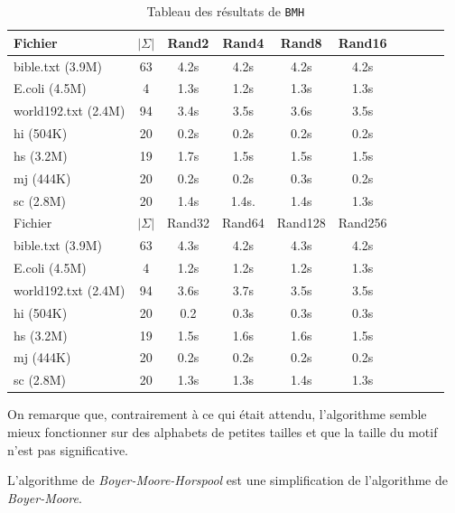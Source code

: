 \documentclass[a4paper,11pt]{article}
\begin{document}
\begin{table}[h]
  \centering
  \begin{tabular}{|l|c|c|c|c|c|c|c|c|c|}
    \hline
    Fichier             & $ | \Sigma | $ & Rand2 & Rand4 & Rand8 & Rand16 \\
    \hline
    
    bible.txt (3.9M)    & 63 & 4.2s & 4.2s  & 4.2s & 4.2s \\
    E.coli (4.5M)       & 4  & 1.3s & 1.2s  & 1.3s & 1.3s \\
    world192.txt (2.4M) & 94 & 3.4s & 3.5s  & 3.6s & 3.5s \\
    hi (504K)           & 20 & 0.2s & 0.2s  & 0.2s & 0.2s \\
    hs (3.2M)           & 19 & 1.7s & 1.5s  & 1.5s & 1.5s \\
    mj (444K)           & 20 & 0.2s & 0.2s  & 0.3s & 0.2s \\
    sc (2.8M)           & 20 & 1.4s & 1.4s. & 1.4s & 1.3s \\

    \hline
    Fichier & $ | \Sigma | $ & Rand32 & Rand64 & Rand128 & Rand256 \\
    \hline
    
    bible.txt (3.9M)    & 63 & 4.3s   & 4.2s   & 4.3s    & 4.2s    \\
    E.coli (4.5M)       & 4  & 1.2s   & 1.2s   & 1.2s    & 1.3s    \\
    world192.txt (2.4M) & 94 & 3.6s   & 3.7s   & 3.5s    & 3.5s    \\
    hi (504K)           & 20 & 0.2    & 0.3s   & 0.3s    & 0.3s    \\
    hs (3.2M)           & 19 & 1.5s   & 1.6s   & 1.6s    & 1.5s    \\
    mj (444K)           & 20 & 0.2s   & 0.2s   & 0.2s    & 0.2s    \\
    sc (2.8M)           & 20 & 1.3s   & 1.3s   & 1.4s    & 1.3s    \\
    \hline
  \end{tabular}
  \caption{Tableau des résultats de \texttt{BMH}}
  \label{tab:bmh}
\end{table}

On remarque que, contrairement à ce qui était attendu, l'algorithme semble mieux fonctionner sur des alphabets de petites tailles et que la taille du motif n'est pas significative.

L'algorithme de \emph{Boyer-Moore-Horspool} est une simplification de l'algorithme de \emph{Boyer-Moore}.
\end{document}
